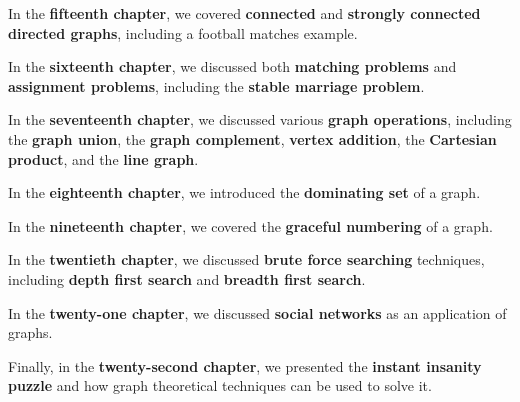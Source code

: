 In the \textbf{fifteenth chapter}, we covered \textbf{connected} and \textbf{strongly connected directed graphs}, including a football matches example.

In the \textbf{sixteenth chapter}, we discussed both \textbf{matching problems} and \textbf{assignment problems}, including the \textbf{stable marriage problem}.

In the \textbf{seventeenth chapter}, we discussed various \textbf{graph operations}, including the \textbf{graph union}, the \textbf{graph complement}, \textbf{vertex addition}, the \textbf{Cartesian product}, and the \textbf{line graph}.

In the \textbf{eighteenth chapter}, we introduced the \textbf{dominating set} of a graph.

In the \textbf{nineteenth chapter}, we covered the \textbf{graceful numbering} of a graph.

In the \textbf{twentieth chapter}, we discussed \textbf{brute force searching} techniques, including \textbf{depth first search} and \textbf{breadth first search}.

In the \textbf{twenty-one chapter}, we discussed \textbf{social networks} as an application of graphs.

Finally, in the \textbf{twenty-second chapter}, we presented the \textbf{instant insanity puzzle} and how graph theoretical techniques can be used to solve it.
